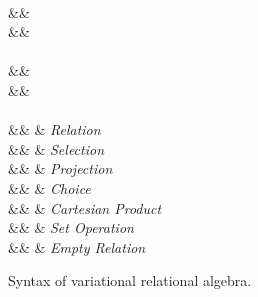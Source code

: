 \begin{figure}
\begin{syntax}

 \\[1ex]
\bullet
  &\eqq&  \\
\circ
  &\eqq& \cup \myOR \cap \\[2ex]

 \\[1ex]
\vCond\in\vCondSet
  &\eqq&   \\
  &\myOR&  \\[2ex]

 \\[1ex]
\vQ\in\qSet
  &\eqq&  \vRel     & \textit{Relation}\\
  &\myOR& \vSel \vQ & \textit{Selection}\\
  &\myOR& \vPrj[\vAttList]{\vQ} & \textit{Projection}\\
  &\myOR& \chc{\vQ,\vQ} & \textit{Choice}\\
  &\myOR& \vQ \times \vQ & \textit{Cartesian Product}\\
  &\myOR& \vQ \circ \vQ  & \textit{Set Operation}\\
  &\myOR& \empRel & \textit{Empty Relation}

\end{syntax}

\caption[Syntax of variational relational algebra]{Syntax of variational relational algebra.}
\label{fig:v-alg-def}
\end{figure}
